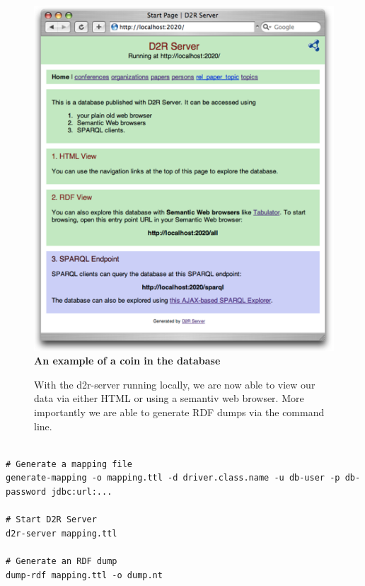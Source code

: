 \documentclass[12pt, oneside]{article}
\begin{document}
\begin{figure}[!htb]%
    \centering%
    \begin{minipage}{.5\textwidth}%
        \centering%
        \includegraphics[scale=0.45]{d2r_server.png}\\
        \textbf{An example of a coin in the database}\footnotemark[6]%
        \label{fig:coin_example}%
    \end{minipage}%
    \begin{minipage}{0.5\textwidth}%
   With the d2r-server running locally, we are now able to view our data via either HTML or using a semantiv web browser. More importantly we are able to generate RDF dumps via the command line.
    \end{minipage}%
\end{figure}%

\begin{lstlisting}

# Generate a mapping file
generate-mapping -o mapping.ttl -d driver.class.name -u db-user -p db-password jdbc:url:...

# Start D2R Server
d2r-server mapping.ttl

# Generate an RDF dump
dump-rdf mapping.ttl -o dump.nt
\end{lstlisting}
\end{document}
